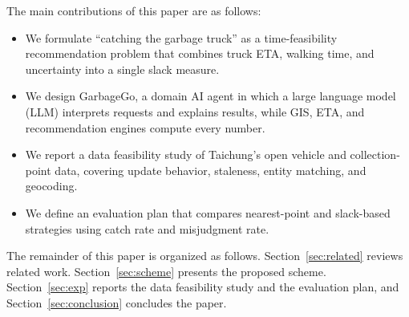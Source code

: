 The main contributions of this paper are as follows:
\begin{itemize}
  \item We formulate ``catching the garbage truck'' as a time-feasibility
        recommendation problem that combines truck ETA, walking time, and
        uncertainty into a single slack measure.
  \item We design GarbageGo, a domain AI agent in which a large language
        model (LLM) interprets requests and explains results, while GIS,
        ETA, and recommendation engines compute every number.
  \item We report a data feasibility study of Taichung's open vehicle and
        collection-point data, covering update behavior, staleness,
        entity matching, and geocoding.
  \item We define an evaluation plan that compares nearest-point and
        slack-based strategies using catch rate and misjudgment rate.
\end{itemize}

The remainder of this paper is organized as follows.
Section~\ref{sec:related} reviews related work.
Section~\ref{sec:scheme} presents the proposed scheme.
Section~\ref{sec:exp} reports the data feasibility study and the
evaluation plan, and Section~\ref{sec:conclusion} concludes the paper.

